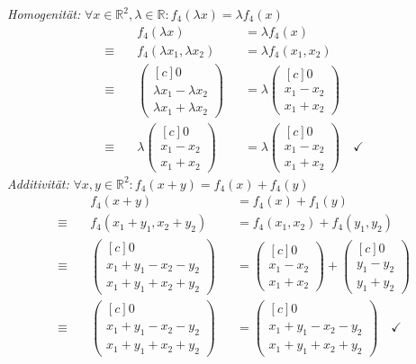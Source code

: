 \documentclass[answers]{exam}
\newcommand{\vektor}[1]{\begin{pmatrix*}[c] #1 \end{pmatrix*}}
\newcommand{\R}{\mathbb{R}}
\begin{document}
\begin{questions}
\begin{parts}
\begin{solution}
            \emph{Homogenität:} $\forall x \in \R^2, \lambda \in \R: f_4(\lambda  x) = \lambda  f_4(x)$
            $$
                \begin{aligned}
                                 & f_4(\lambda  x)                 &  & = \lambda  f_4(x)        \\
                    \equiv \quad & f_4(\lambda  x_1, \lambda  x_2) &  & = \lambda  f_4(x_1, x_2) \\
                    \equiv \quad & \vektor{0                                                     \\ \lambda  x_1 - \lambda  x_2 \\ \lambda  x_1 + \lambda  x_2} &&= \lambda  \vektor{0 \\ x_1 - x_2 \\ x_1 + x_2} \\
                    \equiv \quad & \lambda  \vektor{0                                            \\ x_1 - x_2 \\ x_1 + x_2} &&= \lambda  \vektor{0 \\ x_1 - x_2 \\ x_1 + x_2} \quad \checkmark
                \end{aligned}
            $$
            \emph{Additivität:} $\forall x, y \in \R^2: f_4(x + y) = f_4(x) + f_4(y)$
            $$
                \begin{aligned}
                                 & f_4(x + y)                &  & = f_4(x) + f_1(y)               \\
                    \equiv \quad & f_4(x_1 + y_1, x_2 + y_2) &  & = f_4(x_1, x_2) + f_4(y_1, y_2) \\
                    \equiv \quad & \vektor{0                                                      \\ x_1 + y_1 - x_2 - y_2 \\ x_1 + y_1 + x_2 + y_2} &&= \vektor{0 \\ x_1 - x_2 \\ x_1 + x_2} + \vektor{0 \\ y_1 - y_2 \\ y_1 + y_2}\\
                    \equiv \quad & \vektor{0                                                      \\ x_1 + y_1 - x_2 - y_2 \\ x_1 + y_1 + x_2 + y_2} &&= \vektor{0 \\ x_1 + y_1 - x_2 - y_2 \\ x_1 + y_1 + x_2 + y_2} \quad \checkmark
                \end{aligned}
            $$


\end{solution}
\end{parts}
\end{questions}
\end{document}
